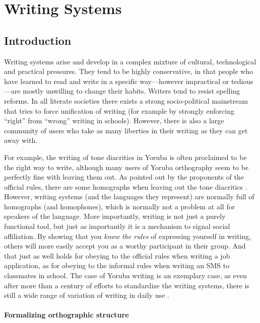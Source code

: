 \chapter{Writing Systems}
\label{writing_systems}

\section{Introduction}
\label{introduction}

Writing systems arise and develop in a complex mixture of cultural,
technological and practical pressures. They tend to be highly conservative, in
that people who have learned to read and write in a specific way---however
impractical or tedious---are mostly unwilling to change their habits. Writers
tend to resist spelling reforms. In all literate societies there exists a strong
socio-political mainstream that tries to force unification of writing (for
example by strongly enforcing ``right'' from ``wrong'' writing in schools).
However, there is also a large community of users who take as many liberties in
their writing as they can get away with.

For example, the writing of tone diacritics in Yoruba is often proclaimed to be
the right way to write, although many users of Yoruba orthography seem to be
perfectly fine with leaving them out. As pointed out by the proponents of the
official rules, there are some homographs when leaving out the tone diacritics
\citep[44]{Olumuyiw2013}. However, writing systems (and the languages they
represent) are normally full of homographs (and homophones), which is normally
not a problem at all for speakers of the language. More importantly, writing is
not just a purely functional tool, but just as importantly it is a mechanism to
signal social affiliation. By showing that you \textit{know the rules} of
expressing yourself in writing, others will more easily accept you as a worthy
participant in their group. And that just as well holds for obeying to the
official rules when writing a job application, as for obeying to the informal
rules when writing an SMS to classmates in school. The case of Yoruba writing is
an exemplary case, as even after more than a century of efforts to standardize
the writing systems, there is still a wide range of variation of writing in
daily use \citep{Olumuyiw2013}.

\subsubsection*{Formalizing orthographic structure}

